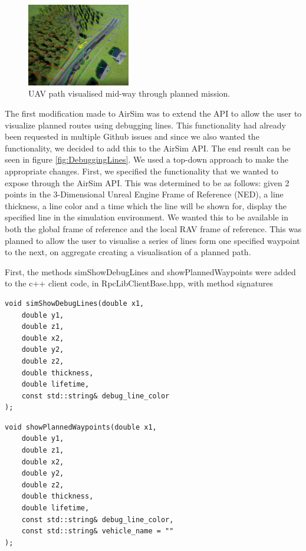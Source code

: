 \begin{figure}
    \centering
    \includegraphics[width=0.4\textwidth]{Chapters/SimulationEnv/Figs/DebuggingLines/RoutesWithRAVsVisible.png}
    \caption{UAV path visualised mid-way through planned mission.}
    \label{fig:DebuggingLinesPlannedMission}
\end{figure}
The first modification made to AirSim was to extend the API to allow the user to visualize planned routes using debugging lines. This functionality had already been requested in multiple Github issues  and since we also wanted the functionality, we decided to add this to the AirSim API. The end result can be seen in figure \ref{fig:DebuggingLines}. We used a top-down approach to make the appropriate changes. First, we specified the functionality that we wanted to expose through the AirSim API. This was determined to be as follows: given 2 points in the 3-Dimensional Unreal Engine Frame of Reference (NED), a line thickness, a line color and a time which the line will be shown for, display the specified line in the simulation environment. We wanted this to be available in both the global frame of reference and the local RAV frame of reference. This was planned to allow the user to visualise a series of lines form one specified waypoint to the next, on aggregate creating a visualisation of a planned path.
\newline


First, the methods simShowDebugLines and showPlannedWaypoints were added to the c++ client code, in RpcLibClientBase.hpp, with method signatures
\begin{verbatim}
void simShowDebugLines(double x1, 
    double y1,
    double z1,
    double x2,
    double y2,
    double z2,
    double thickness, 
    double lifetime,
    const std::string& debug_line_color
);
\end{verbatim}
\begin{verbatim}
void showPlannedWaypoints(double x1, 
    double y1, 
    double z1, 
    double x2, 
    double y2, 
    double z2, 
    double thickness, 
    double lifetime,
    const std::string& debug_line_color,
    const std::string& vehicle_name = ""
);
\end{verbatim}

